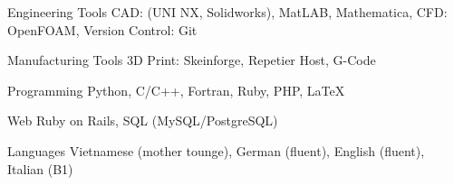 

\begin{cvskills}

  \cvskill
    {Engineering Tools} %
    {CAD: (UNI NX, Solidworks), MatLAB, Mathematica, CFD: OpenFOAM, Version Control: Git} %

  \cvskill
    {Manufacturing Tools} %
    {3D Print: Skeinforge, Repetier Host, G-Code} %

  \cvskill
    {Programming} %
    {Python, C/C++, Fortran, Ruby, PHP, LaTeX} %

  \cvskill
    {Web} %
    {Ruby on Rails, SQL (MySQL/PostgreSQL)} %

  \cvskill
    {Languages} %
    {Vietnamese (mother tounge), German (fluent), English (fluent), Italian (B1)} %

\end{cvskills}
